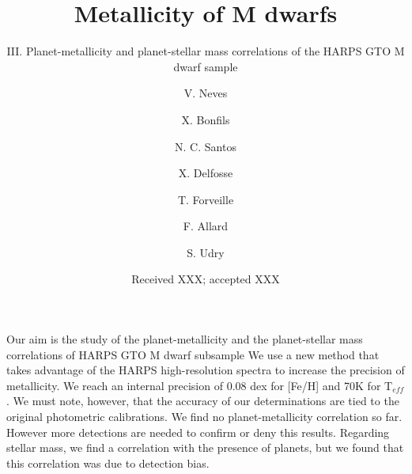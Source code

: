 \documentclass[structabstract]{aa}
\begin{document}
%
   \title{Metallicity of M dwarfs}

   \subtitle{III. Planet-metallicity and planet-stellar mass correlations of the HARPS GTO M dwarf sample}

\author{ V. Neves \and X. Bonfils \and
  N. C. Santos \and X. Delfosse \and
  T. Forveille  \and F. Allard  \and
  S. Udry}


   \date{Received XXX; accepted XXX}

 
  \abstract
   {}
   { Our aim is the study of the planet-metallicity and the planet-stellar mass correlations of HARPS GTO M dwarf subsample}
   { We use a new method that takes advantage of the HARPS high-resolution spectra to increase the precision of metallicity. We reach an internal precision of 0.08 dex for [Fe/H] and 70K for T$_{eff}$. We must note, however, that the accuracy of our determinations are tied to the original photometric calibrations.}
   {We find no planet-metallicity correlation so far. However more detections are needed to confirm or deny this results. Regarding stellar mass, we find a correlation with the presence of planets, but we found that this correlation was due to detection bias.}
   {}



   \maketitle
%
\end{document}
